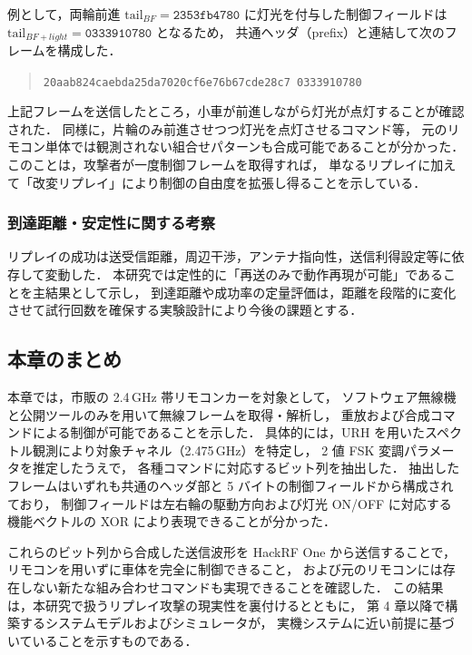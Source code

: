 \documentclass[twocolumn,10pt,a4paper]{jsarticle}
\begin{document}
例として，両輪前進 $\mathrm{tail}_{BF}=\texttt{2353fb4780}$ に灯光を付与した制御フィールドは
$\mathrm{tail}_{BF+light}=\texttt{0333910780}$ となるため，
共通ヘッダ（prefix）と連結して次のフレームを構成した．

\begin{quote}
\texttt{20aab824caebda25da7020cf6e76b67cde28c7 0333910780}
\end{quote}
%
\noindent\hspace{1zw}上記フレームを送信したところ，小車が前進しながら灯光が点灯することが確認された．
同様に，片輪のみ前進させつつ灯光を点灯させるコマンド等，
元のリモコン単体では観測されない組合せパターンも合成可能であることが分かった．
このことは，攻撃者が一度制御フレームを取得すれば，
単なるリプレイに加えて「改変リプレイ」により制御の自由度を拡張し得ることを示している．

\subsubsection{到達距離・安定性に関する考察}
リプレイの成功は送受信距離，周辺干渉，アンテナ指向性，送信利得設定等に依存して変動した．
本研究では定性的に「再送のみで動作再現が可能」であることを主結果として示し，
到達距離や成功率の定量評価は，距離を段階的に変化させて試行回数を確保する実験設計により今後の課題とする．



\subsection{本章のまとめ}

本章では，市販の 2.4\,GHz 帯リモコンカーを対象として，
ソフトウェア無線機と公開ツールのみを用いて無線フレームを取得・解析し，
重放および合成コマンドによる制御が可能であることを示した．
具体的には，URH を用いたスペクトル観測により対象チャネル（2.475\,GHz）を特定し，
2 値 FSK 変調パラメータを推定したうえで，
各種コマンドに対応するビット列を抽出した．
抽出したフレームはいずれも共通のヘッダ部と 5 バイトの制御フィールドから構成されており，
制御フィールドは左右輪の駆動方向および灯光 ON/OFF に対応する
機能ベクトルの XOR により表現できることが分かった．

これらのビット列から合成した送信波形を HackRF One から送信することで，
リモコンを用いずに車体を完全に制御できること，
および元のリモコンには存在しない新たな組み合わせコマンドも実現できることを確認した．
この結果は，本研究で扱うリプレイ攻撃の現実性を裏付けるとともに，
第 4 章以降で構築するシステムモデルおよびシミュレータが，
実機システムに近い前提に基づいていることを示すものである．
\end{document}
